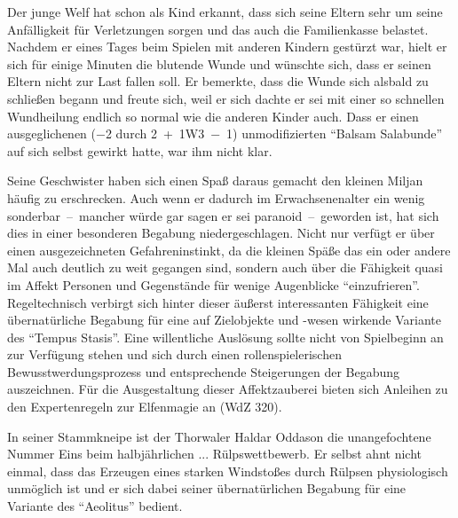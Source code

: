 Der junge Welf hat schon als Kind erkannt, dass sich seine Eltern sehr um seine Anfälligkeit für Verletzungen sorgen und das auch die Familienkasse belastet. Nachdem er eines Tages beim Spielen mit anderen Kindern gestürzt war, hielt er sich für einige Minuten die blutende Wunde und wünschte sich, dass er seinen Eltern nicht zur Last fallen soll. Er bemerkte, dass die Wunde sich alsbald zu schließen begann und freute sich, weil er sich dachte er sei mit einer so schnellen Wundheilung endlich so normal wie die anderen Kinder auch. Dass er einen ausgeglichenen (\SI{-2}{\ZfPstern} durch 2~+~1W3~−~\SI{1}{\AsP}) unmodifizierten \enquote{Balsam Salabunde} auf sich selbst gewirkt hatte, war ihm nicht klar.

Seine Geschwister haben sich einen Spaß daraus gemacht den kleinen Miljan häufig zu erschrecken. Auch wenn er dadurch im Erwachsenenalter ein wenig sonderbar~--~mancher würde gar sagen er sei paranoid~--~geworden ist, hat sich dies in einer besonderen Begabung niedergeschlagen. Nicht nur verfügt er über einen ausgezeichneten Gefahreninstinkt, da die kleinen Späße das ein oder andere Mal auch deutlich zu weit gegangen sind, sondern auch über die Fähigkeit quasi im Affekt Personen und Gegenstände für wenige Augenblicke \enquote{einzufrieren}. Regeltechnisch verbirgt sich hinter dieser äußerst interessanten Fähigkeit eine übernatürliche Begabung für eine auf Zielobjekte und -wesen wirkende Variante des \enquote{Tempus Stasis}. Eine willentliche Auslösung sollte nicht von Spielbeginn an zur Verfügung stehen und sich durch einen rollenspielerischen Bewusstwerdungsprozess und entsprechende Steigerungen der Begabung auszeichnen. Für die Ausgestaltung dieser Affektzauberei bieten sich Anleihen zu den Expertenregeln zur Elfenmagie an (WdZ 320).

In seiner Stammkneipe ist der Thorwaler Haldar Oddason die unangefochtene Nummer Eins beim halbjährlichen ... Rülpswettbewerb. Er selbst ahnt nicht einmal, dass das Erzeugen eines starken Windstoßes durch Rülpsen physiologisch unmöglich ist und er sich dabei seiner übernatürlichen Begabung für eine Variante des \enquote{Aeolitus} bedient.
